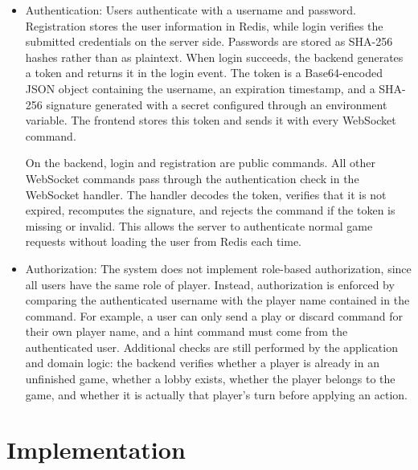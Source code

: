 \documentclass{scrartcl}
\begin{document}
\begin{itemize}
    \item Authentication: \newline
    Users authenticate with a username and password. 
    Registration stores the user information in Redis, while login verifies the submitted credentials on the server side. 
    Passwords are stored as SHA-256 hashes rather than as plaintext. 
    When login succeeds, the backend generates a token and returns it in the login event. 
    The token is a Base64-encoded JSON object containing the username, an expiration timestamp, and a SHA-256 signature generated with a secret configured through an environment variable. 
    The frontend stores this token and sends it with every WebSocket command.

    On the backend, login and registration are public commands. 
    All other WebSocket commands pass through the authentication check in the WebSocket handler. 
    The handler decodes the token, verifies that it is not expired, recomputes the signature, and rejects the command if the token is missing or invalid. 
    This allows the server to authenticate normal game requests without loading the user from Redis each time.
    \item Authorization: \newline
    The system does not implement role-based authorization, since all users have the same role of player. 
    Instead, authorization is enforced by comparing the authenticated username with the player name contained in the command. 
    For example, a user can only send a play or discard command for their own player name, and a hint command must come from the authenticated user. 
    Additional checks are still performed by the application and domain logic: the backend verifies whether a player is already in an unfinished game, whether a lobby exists, whether the player belongs to the game, and whether it is actually that player's turn before applying an action.

\end{itemize}
\newpage

\section{Implementation}\label{implementation}
\end{document}

